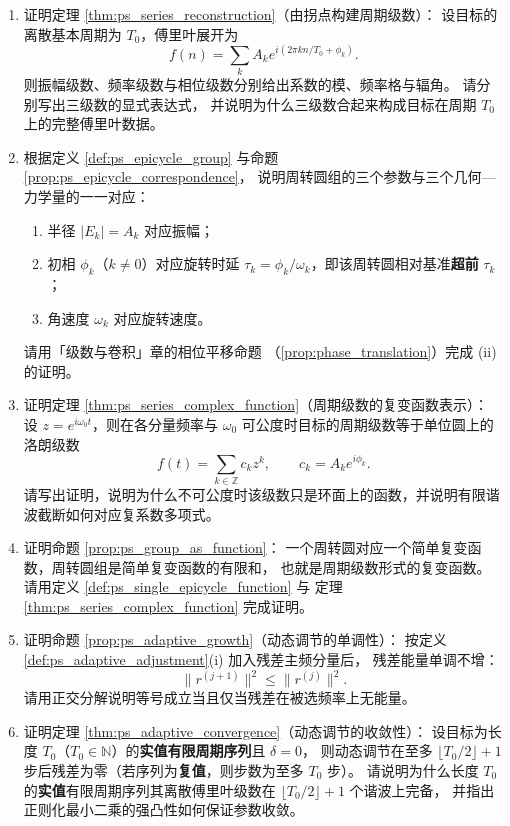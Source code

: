 \begin{enumerate}[leftmargin=3em, label=\textbf{题 \arabic*}]
    \item 证明定理 \ref{thm:ps_series_reconstruction}（由拐点构建周期级数）：
    设目标的离散基本周期为 $T_0$，傅里叶展开为
    \[
    f(n)=\sum_kA_ke^{i(2\pi kn/T_0+\phi_k)}.
    \]
    则振幅级数、频率级数与相位级数分别给出系数的模、频率格与辐角。
    请分别写出三级数的显式表达式，
    并说明为什么三级数合起来构成目标在周期 $T_0$ 上的完整傅里叶数据。

    \item 根据定义 \ref{def:ps_epicycle_group} 与命题 \ref{prop:ps_epicycle_correspondence}，
    说明周转圆组的三个参数与三个几何—力学量的一一对应：
    \begin{enumerate}[label=(\roman*)]
        \item 半径 $|E_k|=A_k$ 对应振幅；
        \item 初相 $\phi_k$（$k\ne0$）对应旋转时延 $\tau_k=\phi_k/\omega_k$，即该周转圆相对基准\textbf{超前} $\tau_k$；
        \item 角速度 $\omega_k$ 对应旋转速度。
    \end{enumerate}
    请用「级数与卷积」章的相位平移命题
    （\cref{prop:phase_translation}）完成 (ii) 的证明。

    \item 证明定理 \ref{thm:ps_series_complex_function}（周期级数的复变函数表示）：
    设 $z=e^{i\omega_0t}$，则在各分量频率与 $\omega_0$ 可公度时目标的周期级数等于单位圆上的洛朗级数
    \[
    f(t)=\sum_{k\in\mathbb{Z}}c_kz^k,\qquad c_k=A_ke^{i\phi_k}.
    \]
    请写出证明，说明为什么不可公度时该级数只是环面上的函数，并说明有限谐波截断如何对应复系数多项式。

    \item 证明命题 \ref{prop:ps_group_as_function}：
    一个周转圆对应一个简单复变函数，周转圆组是简单复变函数的有限和，
    也就是周期级数形式的复变函数。
    请用定义 \ref{def:ps_single_epicycle_function} 与
    定理 \ref{thm:ps_series_complex_function} 完成证明。

    \item 证明命题 \ref{prop:ps_adaptive_growth}（动态调节的单调性）：
    按定义 \ref{def:ps_adaptive_adjustment}(i) 加入残差主频分量后，
    残差能量单调不增：
    \[
    \|r^{(j+1)}\|^2\le\|r^{(j)}\|^2.
    \]
    请用正交分解说明等号成立当且仅当残差在被选频率上无能量。

    \item 证明定理 \ref{thm:ps_adaptive_convergence}（动态调节的收敛性）：
    设目标为长度 $T_0$（$T_0\in\mathbb N$）的\textbf{实值有限周期序列}且 $\delta=0$，
    则动态调节在至多 $\lfloor T_0/2\rfloor+1$ 步后残差为零（若序列为\textbf{复值}，则步数为至多 $T_0$ 步）。
    请说明为什么长度 $T_0$ 的\textbf{实值}有限周期序列其离散傅里叶级数在
    $\lfloor T_0/2\rfloor+1$ 个谐波上完备，
    并指出正则化最小二乘的强凸性如何保证参数收敛。


\end{enumerate}
